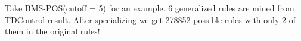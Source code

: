 Take BMS-POS(cutoff = 5) for an example. 6 generalized rules are
mined from TDControl result. After specializing we get
278852 possible rules with only 2 of them in the original rules!
%
%
